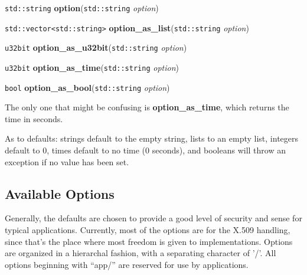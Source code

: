 \documentclass{article}
\newcommand{\function}[1]{\textbf{#1}}
\newcommand{\type}[1]{\texttt{#1}}
\renewcommand{\arg}[1]{\textsl{#1}}
\begin{document}
\type{std::string} \function{option}(\type{std::string} \arg{option})

\type{std::vector<std::string>} \function{option\_as\_list}(\type{std::string}
\arg{option})

\type{u32bit} \function{option\_as\_u32bit}(\type{std::string} \arg{option})

\type{u32bit} \function{option\_as\_time}(\type{std::string} \arg{option})

\type{bool} \function{option\_as\_bool}(\type{std::string} \arg{option})

The only one that might be confusing is \function{option\_as\_time},
which returns the time in seconds.

As to defaults: strings default to the empty string, lists to an empty list,
integers default to 0, times default to no time (0 seconds), and booleans will
throw an exception if no value has been set.

\subsection{Available Options}

Generally, the defaults are chosen to provide a good level of security and
sense for typical applications. Currently, most of the options are for the
X.509 handling, since that's the place where most freedom is given to
implementations. Options are organized in a hierarchal fashion, with a
separating character of '/'. All options beginning with ``app/'' are reserved
for use by applications.

\newcommand{\confopt}[4]{
   \textbf{``#1''}, (\textbf{#2}, default \textbf{#3}): #4.
}
\end{document}
